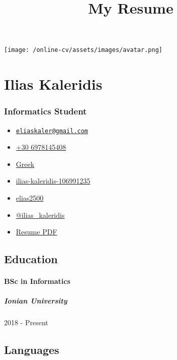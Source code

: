 \documentclass[english,]{article}
\title{My Resume}
\date{}
\providecommand{\tightlist}{%
  \setlength{\itemsep}{0pt}\setlength{\parskip}{0pt}}
\let\oldparagraph\paragraph
\renewcommand{\paragraph}[1]{\oldparagraph{#1}\mbox{}}
\let\oldsubparagraph\subparagraph
\renewcommand{\subparagraph}[1]{\oldsubparagraph{#1}\mbox{}}
\begin{document}
\maketitle

\texttt{[image: /online-cv/assets/images/avatar.png]}

\hypertarget{ilias-kaleridis}{%
\section{Ilias Kaleridis}\label{ilias-kaleridis}}

\hypertarget{informatics-student}{%
\subsubsection{Informatics Student}\label{informatics-student}}

\begin{itemize}
\tightlist
\item
  \emph{}
  \href{mailto:eliaskaler@gmail.com}{\nolinkurl{eliaskaler@gmail.com}}
\item
  \emph{} \href{tel:+30\%206978145408}{+30 6978145408}
\item
  \emph{} \href{}{Greek}
\item
  \emph{}
  \href{https://linkedin.com/in/ilias-kaleridis-106991235}{ilias-kaleridis-106991235}
\item
  \emph{} \href{http://github.com/elias2500}{elias2500}
\item
  \emph{} \href{https://twitter.com/@ilias_kaleridis}{@ilias\_kaleridis}
\item
  \emph{}
  \href{https://elias2500.github.io/online-cv/pdf/index.pdf}{Resume PDF}
\end{itemize}

\hypertarget{education}{%
\subsection{Education}\label{education}}

\hypertarget{bsc-in-informatics}{%
\paragraph{BSc in Informatics}\label{bsc-in-informatics}}

\hypertarget{ionian-university}{%
\subparagraph{Ionian University}\label{ionian-university}}

2018 - Present

\hypertarget{languages}{%
\subsection{Languages}\label{languages}}
\end{document}
